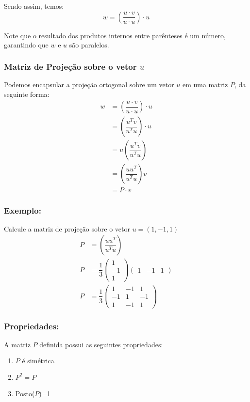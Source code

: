 \documentclass[12pt]{article}
\begin{document}
Sendo assim, temos:
\begin{equation*}
	w=\left(\dfrac{u\cdot v}{u\cdot u}\right) \cdot u
\end{equation*}

Note que o resultado dos produtos internos entre parênteses é um número, garantindo que $w$ e $u$ são paralelos.

\subsubsection{Matriz de Projeção sobre o vetor $u$}


Podemos encapsular a projeção ortogonal sobre um vetor $u$ em uma matriz $P$, da seguinte forma:
\begin{align*}
	w&=\left(\dfrac{u\cdot v}{u\cdot u}\right) \cdot u\\
	&=\left(\dfrac{u^{T} v}{u^{T} u}\right) \cdot u\\
	&=u\left(\dfrac{u^{T} v}{u^{T} u}\right)\\
	&=\left(\dfrac{u u^{T}}{u^{T} u}\right)v\\
	&=P\cdot v
\end{align*}

\subsubsection{Exemplo:}
Calcule a matriz de projeção sobre o vetor $u=(1,-1,1)$
\begin{align*}
	P&=\left(\dfrac{u u^{T}}{u^{T} u}\right)\\
	P&=\dfrac{1}{3}\begin{pmatrix}
		1 \\
		-1 \\
		1
	\end{pmatrix}\begin{pmatrix}
		1 & -1 & 1
	\end{pmatrix}\\
	P&=\dfrac{1}{3}\begin{pmatrix}
		1 & -1 & 1\\
		-1 & 1 & -1\\ 
		1 & -1 & 1
	\end{pmatrix}
\end{align*}

\subsubsection{Propriedades:}

A matriz $P$ definida possui as seguintes propriedades:
\begin{enumerate}
	\item $P$ é simétrica
	\item $P^2=P$
	\item Posto($P$)=1
\end{enumerate}
\end{document}
